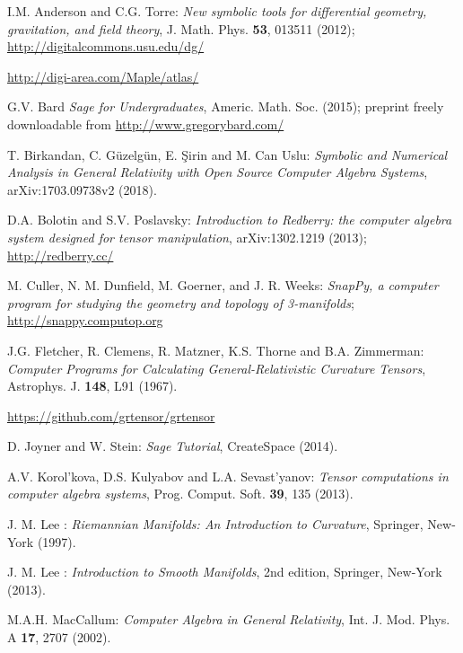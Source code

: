\begin{thebibliography}{123}

I.M. Anderson and C.G. Torre:
{\em New symbolic tools for differential geometry, gravitation,
and field theory},
J. Math. Phys. {\bf 53}, 013511 (2012);\\
\url{http://digitalcommons.usu.edu/dg/}

\url{http://digi-area.com/Maple/atlas/}

G.V. Bard {\it Sage for Undergraduates}, Americ. Math. Soc. (2015);
preprint freely downloadable from \url{http://www.gregorybard.com/}

T. Birkandan, C. Güzelgün, E. Şirin and M. Can Uslu:
{\em Symbolic and Numerical Analysis in General Relativity with Open Source Computer Algebra Systems},
arXiv:1703.09738v2 (2018).

D.A. Bolotin and S.V. Poslavsky: \emph{Introduction to Redberry: the computer algebra system designed for tensor manipulation}, arXiv:1302.1219 (2013);\\
\url{http://redberry.cc/}

M. Culler, N. M. Dunfield, M. Goerner, and J. R. Weeks: {\em SnapPy, a computer program for studying the geometry and topology of 3-manifolds};\\
\url{http://snappy.computop.org}

J.G. Fletcher, R. Clemens, R. Matzner, K.S. Thorne and B.A. Zimmerman:
{\em Computer Programs for Calculating General-Relativistic Curvature Tensors},
Astrophys. J. {\bf 148}, L91 (1967).

\url{https://github.com/grtensor/grtensor}

D. Joyner and W. Stein: {\it Sage Tutorial}, CreateSpace (2014).

A.V. Korol'kova, D.S. Kulyabov and L.A. Sevast'yanov:
{\em Tensor computations in computer algebra systems},
Prog. Comput. Soft.
{\bf 39}, 135 (2013).

J. M. Lee : {\em Riemannian Manifolds: An Introduction to Curvature},
Springer, New-York (1997).

J. M. Lee : {\em Introduction to Smooth Manifolds}, 2nd edition,
Springer, New-York (2013).

M.A.H. MacCallum: {\em Computer Algebra in General Relativity},
Int. J. Mod. Phys. A {\bf 17}, 2707 (2002).


\end{thebibliography}
